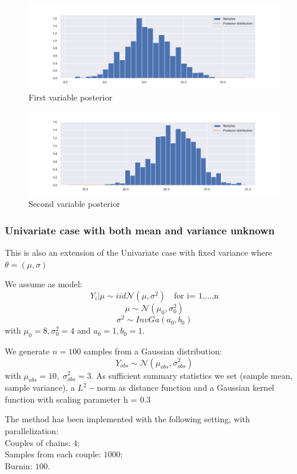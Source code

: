 \documentclass {article}
\begin{document}
\begin{figure}[h!]
	\centering
	\includegraphics[width=\textwidth]{immagini_abc_coupling_multivariate/coupling_abc_mult_histogram_1}	
	\caption{First variable posterior}
\end{figure}
\begin{figure}[h!]
	\centering
	\includegraphics[width=\textwidth]{immagini_abc_coupling_multivariate/coupling_abc_mult_histogram_2}	
	\caption{Second variable posterior}
\end{figure}



\subsubsection{Univariate case with both mean and variance unknown}

This is also an extension of the Univariate case with fixed variance where $\theta = (\mu,\sigma)$

We assume as model:
$$ Y_i | \mu \sim{iid} \mathcal{N}(\mu, \sigma ^2) \quad \text{for i= 1,...,n} $$
$$ \mu  \sim \mathcal{N}(\mu_0, \sigma_0^2)$$
$$ \sigma^2 \sim InvGa(a_0,b_0)
$$
with $\mu_0=8, \sigma_0^2=4$ and $a_0=1, b_0=1$.

We generate $n= 100$ samples from a Gaussian distribution:
$$
Y_{obs} \sim \mathcal{N}(\mu_{obs}, \sigma_{obs} ^2)
$$
with
$
\mu_{obs} = 10, \;
\sigma_{obs} ^2 = 3
$.
As sufficient summary statistics we set (sample mean, sample variance), a $L^2-$norm as distance function and a Gaussian kernel function with scaling parameter h = 0.3 

The method has been implemented with the following setting, with parallelization:\\
Couples of chains: $4$;\\
Samples from each couple: $1000$;\\
Burnin: $100$.
\end{document}
